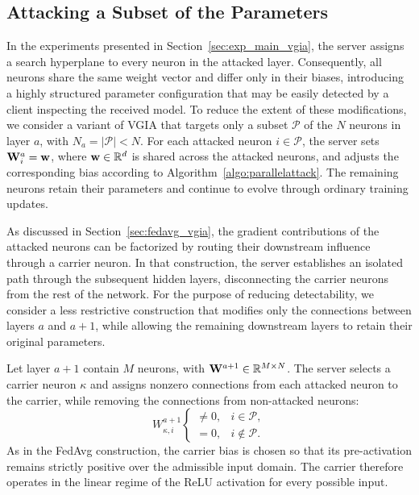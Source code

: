 \subsection{Attacking a Subset of the Parameters}\label{sec:detectability}

In the experiments presented in Section~\ref{sec:exp_main_vgia}, the server assigns a search hyperplane to every neuron in the attacked layer. Consequently, all neurons share the same weight vector and differ only in their biases, introducing a highly structured parameter configuration that may be easily detected by a client inspecting the received model. To reduce the extent of these modifications, we consider a variant of VGIA that targets only a subset $\mathcal{P}$ of the $N$ neurons in layer $a$, with $N_a = |\mathcal{P}| < N$. For each attacked neuron $i\in\mathcal{P}$, the server sets $\mathbf{W}_i^a=\mathbf{w}$, where $\mathbf{w}\in\mathbb{R}^d$ is shared across the attacked neurons, and adjusts the corresponding bias according to Algorithm~\ref{algo:parallelattack}. The remaining neurons retain their parameters and continue to evolve through ordinary training updates.

As discussed in Section~\ref{sec:fedavg_vgia}, the gradient contributions of the attacked neurons can be factorized by routing their downstream influence through a carrier neuron. In that construction, the server establishes an isolated path through the subsequent hidden layers, disconnecting the carrier neurons from the rest of the network. For the purpose of reducing detectability, we consider a less restrictive construction that modifies only the connections between layers $a$ and $a+1$, while allowing the remaining downstream layers to retain their original parameters.

Let layer $a+1$ contain $M$ neurons, with $\mathbf{W}^{a+1}\in\mathbb{R}^{M\times N}$. The server selects a carrier neuron $\kappa$ and assigns nonzero connections from each attacked neuron to the carrier, while removing the connections from non-attacked neurons:
\begin{equation*}
W^{a+1}_{\kappa,i}
\begin{cases}
\neq 0, & i\in\mathcal P,\\
=0, & i\notin\mathcal P.
\end{cases}
\end{equation*}
As in the FedAvg construction, the carrier bias is chosen so that its pre-activation remains strictly positive over the admissible input domain. The carrier therefore operates in the linear regime of the ReLU activation for every possible input.

